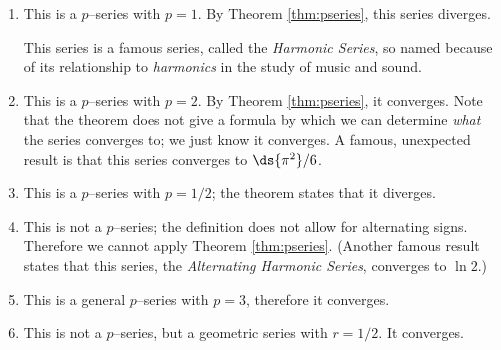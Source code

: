 {\begin{enumerate}
\item		This is a $p$--series with $p=1$. By Theorem \ref{thm:pseries}, this series diverges. 

This series is a famous series, called the \emph{Harmonic Series}, so named because of its relationship to \emph{harmonics} in the study of music and sound. 

\item		This is a $p$--series with $p=2$. By Theorem \ref{thm:pseries}, it converges. Note that the theorem does not give a formula by which we can determine \emph{what} the series converges to; we just know it converges. A famous, unexpected result is that this series converges to $\ds{\pi^2}/{6}$.

\item		This is a $p$--series with $p=1/2$; the theorem states that it diverges.

\item		This is not a $p$--series; the definition does not allow for alternating signs. Therefore we cannot apply Theorem \ref{thm:pseries}. (Another famous result states that this series, the \emph{Alternating Harmonic Series}, converges to $\ln 2$.)

\item		This is a general $p$--series with $p=3$, therefore it converges.

\item		This is not a $p$--series, but a geometric series with $r=1/2$. It converges.
\end{enumerate}
\baselineskip
}\\

